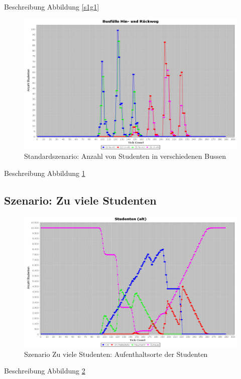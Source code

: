 \documentclass[12pt,a4paper]{scrartcl}
\begin{document}
Beschreibung Abbildung \ref{s1g1}

\begin{figure}
\includegraphics[scale=0.4]{Standardszenario_Busse.png}
\caption{Standardszenario: Anzahl von Studenten in verschiedenen Bussen}
\label{s1g2}
\end{figure}

Beschreibung Abbildung \ref{s1g2}

\subsection{Szenario: Zu viele Studenten}\label{s2}

\begin{figure}
\includegraphics[scale=0.4]{Viele_Studenten_Aufenthaltsorte.png}
\caption{Szenario \glqq Zu viele Studenten\grqq : Aufenthaltsorte der Studenten}
\label{s2g1}
\end{figure}

Beschreibung Abbildung \ref{s2g1}
\end{document}
